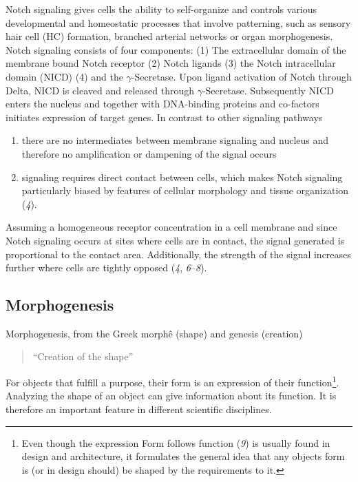 \documentclass[11pt,singlespacinge,twoside]{reedthesis} %
\providecommand{\tightlist}{%
  \setlength{\itemsep}{0pt}\setlength{\parskip}{0pt}}
\theoremstyle{definition}
\theoremstyle{definition}
\theoremstyle{definition}
\theoremstyle{remark}
\begin{document}
Notch signaling gives cells the ability to self-organize and controls various developmental and homeostatic processes that involve patterning, such as sensory hair cell (HC) formation, branched arterial networks or organ morphogenesis. Notch signaling consists of four components:
(1) The extracellular domain of the membrane bound Notch receptor (2) Notch ligands (3) the Notch intracellular domain (NICD) (4) and the \(\gamma\)-Secretase. Upon ligand activation of Notch through Delta, NICD is cleaved and released through \(\gamma\)-Secretase. Subsequently NICD enters the nucleus and together with DNA-binding proteins and co-factors initiates expression of target genes. In contrast to other signaling pathways
\begin{enumerate}
\def\labelenumi{\arabic{enumi}.}
\tightlist
\item
  there are no intermediates between membrane signaling and nucleus and therefore no amplification or dampening of the signal occurs
\item
  signaling requires direct contact between cells, which makes Notch signaling particularly biased by features of cellular morphology and tissue organization (\emph{4}).
\end{enumerate}
Assuming a homogeneous receptor concentration in a cell membrane and since Notch signaling occurs at sites where cells are in contact, the signal generated is proportional to the contact area. Additionally, the strength of the signal increases further where cells are tightly opposed (\emph{4}, \emph{6}--\emph{8}).

\hypertarget{intro-morph}{%
\subsection{Morphogenesis}\label{intro-morph}}

Morphogenesis, from the Greek morphê (shape) and genesis (creation)
\begin{quote}
``Creation of the shape''
\end{quote}
For objects that fulfill a purpose, their form is an expression of their function\footnote{Even though the expression Form follows function (\emph{9}) is usually found in design and architecture, it formulates the general idea that any objects form is (or in design should) be shaped by the requirements to it.}. Analyzing the shape of an object can give information about its function. It is therefore an important feature in different scientific disciplines.
\end{document}
